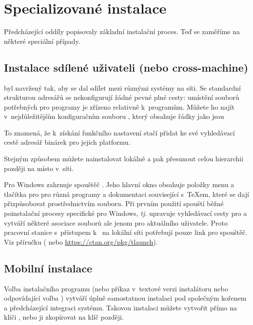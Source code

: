 \documentclass[\classoptions,slovak,english,czech]{\classname}
\begin{document}
\section{Specializované instalace}

Předcházející oddíly popisovaly základní instalační proces.
Teď se zaměříme na některé speciální případy.

\subsection{Instalace sdílené uživateli (nebo cross-machine)}
\label{sec:sharedinstall}

\TL{} byl navržený tak, aby se dal sdílet mezi různými systémy na síti. 
Se standardní strukturou adresářů se nekonfigurují 
žádné %
pevné plné cesty: umístění souborů potřebných pro programy \TL{}
je zřízeno relativně k~programům.  Můžete ho 
najít v~nejdůležitějším konfiguračním souboru
, který obsahuje řádky jako jsou
To znamená, že k~získání funkčního nastavení stačí 
přidat ke své vyhledávací cestě adresář binárek \TL{} 
pro jejich platformu.

Stejným způsobem můžete nainstalovat \TL{} lokálně a 
pak přesunout celou hierarchii později na místo v~síti.

Pro Windows \TL{} zahrnuje spouštěč . 
Jeho hlavní okno obsahuje položky menu a tlačítka pro 
pro různá programy a dokumentaci související s~\TeX{}em,
které se dají přizpůsobovat prostřednictvím  souboru.
Při prvním použití spouští běžné poinstalační procesy specifické pro Windows, 
\emph{tj.} upravuje vyhledávací cesty pro \TL{} a
vytváří některé asociace souborů ale jenom pro aktuálního uživatele. 
Proto pracovní stanice s~přístupem k~\TL{} na lokální síti 
potřebují pouze link pro spouštěč. Viz příručku 
 ( nebo
\url{https://ctan.org/pkg/tlaunch}).

\subsection{Mobilní \USB{} instalace}
\label{sec:portable-tl}

Volba instalačního programu  (nebo 
příkaz  v~textové verzi instalátoru nebo 
odpovídající volba \GUI{}) vytváří úplně samostatnou 
instalaci \TL{} pod společným kořenem a předcházející integraci systému. 
Takovou instalaci můžete vytvořit přímo na klíči \USB{}, 
nebo ji zkopírovat na klíč \USB{} později.
\end{document}
